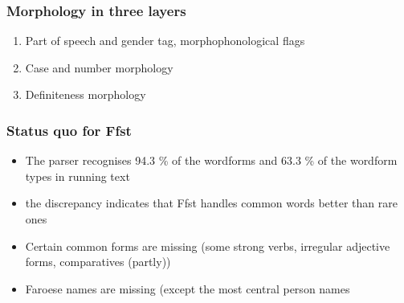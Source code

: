 \documentclass{beamer}
\begin{document}
\begin{frame}
\frametitle{Morphology in three layers}
\begin{enumerate}
\item Part of speech and gender tag, morphophonological flags
\item Case and number morphology
\item Definiteness morphology
\end{enumerate}
\end{frame}






\begin{frame}
\frametitle{Status quo for Ffst}
\begin{itemize}
\item The parser recognises 94.3 \% of the wordforms and 63.3  \% of the wordform types in running text
\item  the discrepancy indicates that Ffst handles common words better than rare ones
\item{Certain common forms are missing (some strong verbs, irregular adjective forms, comparatives (partly))}
\item{Faroese names are missing (except the most central person names}
\end{itemize}
\end{frame}


\end{document}
